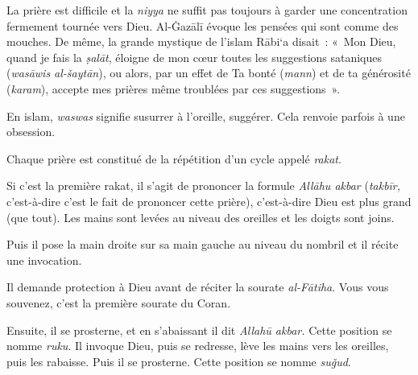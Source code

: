 La prière est difficile et la \emph{niyya} ne suffit pas toujours à
garder une concentration fermement tournée vers Dieu. Al-Ġazālī \label{theol:AlGazali13} évoque
les pensées qui sont comme des mouches. De même, la grande mystique de
l'islam Rābi`a disait~: «~Mon Dieu, quand je fais la \emph{ṣalāt},
éloigne de mon cœur toutes les suggestions sataniques (\emph{wasāwis
al-šaytān}), ou alors, par un effet de Ta bonté (\emph{mann}) et de ta
générosité (\emph{karam}), accepte mes prières même troublées par ces
suggestions~».

En islam, \emph{waswas} signifie susurrer à l'oreille, suggérer. Cela
renvoie parfois à une obsession.


Chaque prière est constitué de la répétition d'un cycle appelé
\emph{rakat}.

Si c'est la première rakat, il s'agit de prononcer la formule
\emph{Allāhu akbar} (\emph{takbīr,} c'est-à-dire c'est le fait de
prononcer cette prière), c'est-à-dire Dieu est plus grand (que tout).
Les mains sont levées au niveau des oreilles et les doigts sont joins.


Puis il pose la main droite sur sa main gauche au niveau du nombril et
il récite une invocation.

Il demande protection à Dieu avant de réciter la sourate
\emph{al-Fātiha}. Vous vous souvenez, c'est la première sourate du
Coran.

Ensuite, il se prosterne, et en s'abaissant il dit \emph{Allahū akbar.}
Cette position se nomme \emph{ruku}. Il invoque Dieu, puis se redresse,
lève les mains vers les oreilles, puis les rabaisse. Puis il se
prosterne. Cette position se nomme \emph{suǧud}.


